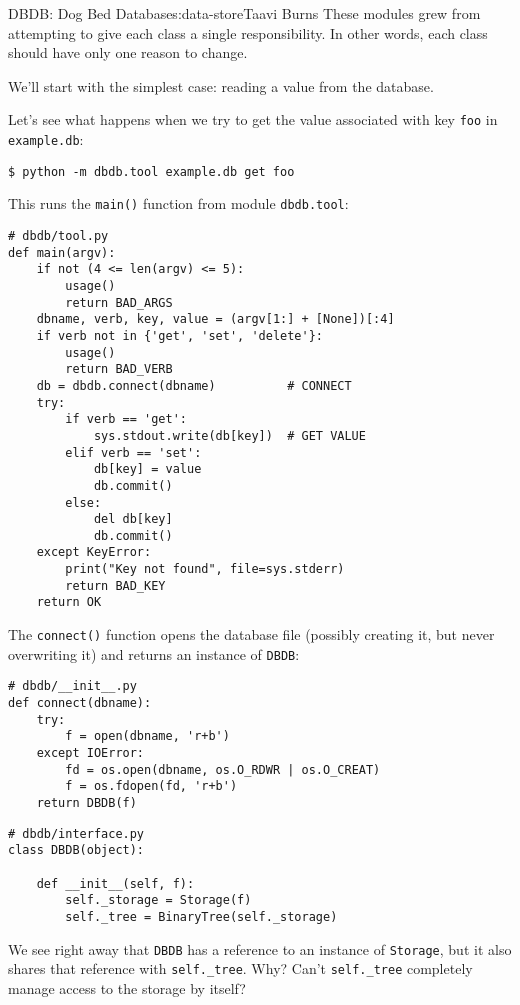 \begin{aosachapter}{DBDB: Dog Bed Database}{s:data-store}{Taavi Burns}
These modules grew from attempting to give each class a single
responsibility. In other words, each class should have only one reason
to change.

\label{reading-a-value}

We'll start with the simplest case: reading a value from the database.

Let's see what happens when we try to get the value associated with key
\texttt{foo} in \texttt{example.db}:

\begin{verbatim}
$ python -m dbdb.tool example.db get foo
\end{verbatim}

This runs the \texttt{main()} function from module \texttt{dbdb.tool}:

\begin{verbatim}
# dbdb/tool.py
def main(argv):
    if not (4 <= len(argv) <= 5):
        usage()
        return BAD_ARGS
    dbname, verb, key, value = (argv[1:] + [None])[:4]
    if verb not in {'get', 'set', 'delete'}:
        usage()
        return BAD_VERB
    db = dbdb.connect(dbname)          # CONNECT
    try:
        if verb == 'get':
            sys.stdout.write(db[key])  # GET VALUE
        elif verb == 'set':
            db[key] = value
            db.commit()
        else:
            del db[key]
            db.commit()
    except KeyError:
        print("Key not found", file=sys.stderr)
        return BAD_KEY
    return OK
\end{verbatim}

The \texttt{connect()} function opens the database file (possibly
creating it, but never overwriting it) and returns an instance of
\texttt{DBDB}:

\begin{verbatim}
# dbdb/__init__.py
def connect(dbname):
    try:
        f = open(dbname, 'r+b')
    except IOError:
        fd = os.open(dbname, os.O_RDWR | os.O_CREAT)
        f = os.fdopen(fd, 'r+b')
    return DBDB(f)
\end{verbatim}

\begin{verbatim}
# dbdb/interface.py
class DBDB(object):

    def __init__(self, f):
        self._storage = Storage(f)
        self._tree = BinaryTree(self._storage)
\end{verbatim}

We see right away that \texttt{DBDB} has a reference to an instance of
\texttt{Storage}, but it also shares that reference with
\texttt{self.\_tree}. Why? Can't \texttt{self.\_tree} completely manage
access to the storage by itself?


\end{aosachapter}
